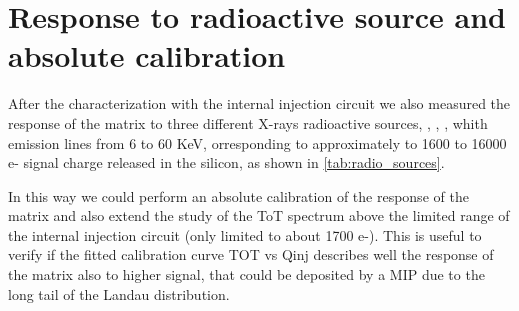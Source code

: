 \section{Response to radioactive source and absolute calibration} \label{sec:source_ana}


After the characterization with the internal injection circuit we also measured the response of the matrix to three different X-rays radioactive sources, , , , whith emission lines from 6 to 60 KeV, orresponding to approximately to 1600 to 16000 e- signal charge released in the silicon, as shown in \autoref{tab:radio_sources}.

In this way we could perform an absolute calibration of the response of the matrix and also extend the study of the ToT spectrum above the limited range of the internal injection circuit (only limited to about 1700 e-). This is useful to verify if the fitted calibration curve TOT vs Qinj describes well the response of the matrix also to higher signal, that could be deposited by a MIP due to the long tail of the Landau distribution. 

